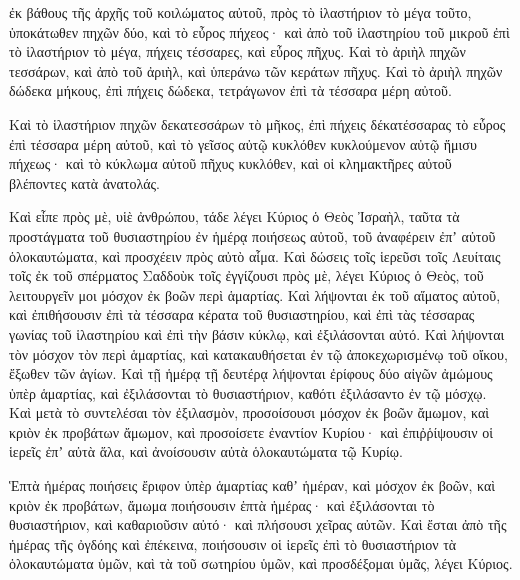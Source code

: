 {ἐκ βάθους τῆς ἀρχῆς τοῦ κοιλώματος αὐτοῦ, πρὸς τὸ ἱλαστήριον τὸ μέγα τοῦτο, ὑποκάτωθεν πηχῶν δύο, καὶ τὸ εὖρος πήχεος· καὶ ἀπὸ τοῦ ἱλαστηρίου τοῦ μικροῦ ἐπὶ τὸ ἱλαστήριον τὸ μέγα, πήχεις τέσσαρες, καὶ εὖρος πῆχυς.
Καὶ τὸ ἀριὴλ πηχῶν τεσσάρων, καὶ ἀπὸ τοῦ ἀριὴλ, καὶ ὑπεράνω τῶν κεράτων πῆχυς.
Καὶ τὸ ἀριὴλ πηχῶν δώδεκα μήκους, ἐπὶ πήχεις δώδεκα, τετράγωνον ἐπὶ τὰ τέσσαρα μέρη αὐτοῦ.
\par }{\PP {}Καὶ τὸ ἱλαστήριον πηχῶν δεκατεσσάρων τὸ μῆκος, ἐπὶ πήχεις δέκατέσσαρας τὸ εὖρος ἐπὶ τέσσαρα μέρη αὐτοῦ, καὶ τὸ γεῖσος αὐτῷ κυκλόθεν κυκλούμενον αὐτῷ ἥμισυ πήχεως· καὶ τὸ κύκλωμα αὐτοῦ πῆχυς κυκλόθεν, καὶ οἱ κλημακτῆρες αὐτοῦ βλέποντες κατὰ ἀνατολάς.
\par }{\PP {}Καὶ εἶπε πρὸς μὲ, υἱὲ ἀνθρώπου, τάδε λέγει Κύριος ὁ Θεὸς Ἰσραὴλ, ταῦτα τὰ προστάγματα τοῦ θυσιαστηρίου ἐν ἡμέρᾳ ποιήσεως αὐτοῦ, τοῦ ἀναφέρειν ἐπʼ αὐτοῦ ὁλοκαυτώματα, καὶ προσχέειν πρὸς αὐτὸ αἷμα.
Καὶ δώσεις τοῖς ἱερεῦσι τοῖς Λευίταις τοῖς ἐκ τοῦ σπέρματος Σαδδοὺκ τοῖς ἐγγίζουσι πρὸς μὲ, λέγει Κύριος ὁ Θεὸς, τοῦ λειτουργεῖν μοι μόσχον ἐκ βοῶν περὶ ἁμαρτίας.
Καὶ λήψονται ἐκ τοῦ αἵματος αὐτοῦ, καὶ ἐπιθήσουσιν ἐπὶ τὰ τέσσαρα κέρατα τοῦ θυσιαστηρίου, καὶ ἐπὶ τὰς τέσσαρας γωνίας τοῦ ἱλαστηρίου καὶ ἐπὶ τὴν βάσιν κύκλῳ, καὶ ἐξιλάσονται αὐτό.
Καὶ λήψονται τὸν μόσχον τὸν περὶ ἁμαρτίας, καὶ κατακαυθήσεται ἐν τῷ ἀποκεχωρισμένῳ τοῦ οἴκου, ἔξωθεν τῶν ἁγίων.
Καὶ τῇ ἡμέρᾳ τῇ δευτέρᾳ λήψονται ἐρίφους δύο αἰγῶν ἀμώμους ὑπὲρ ἁμαρτίας, καὶ ἐξιλάσονται τὸ θυσιαστήριον, καθότι ἐξιλάσαντο ἐν τῷ μόσχῳ.
Καὶ μετὰ τὸ συντελέσαι τὸν ἐξιλασμὸν, προσοίσουσι μόσχον ἐκ βοῶν ἄμωμον, καὶ κριὸν ἐκ προβάτων ἄμωμον,
καὶ προσοίσετε ἐναντίον Κυρίου· καὶ ἐπιῤῥίψουσιν οἱ ἱερεῖς ἐπʼ αὐτὰ ἅλα, καὶ ἀνοίσουσιν αὐτὰ ὁλοκαυτώματα τῷ Κυρίῳ.
\par }{\PP {}Ἑπτὰ ἡμέρας ποιήσεις ἔριφον ὑπὲρ ἁμαρτίας καθʼ ἡμέραν, καὶ μόσχον ἐκ βοῶν, καὶ κριὸν ἐκ προβάτων, ἄμωμα ποιήσουσιν
ἑπτὰ ἡμέρας· καὶ ἐξιλάσονται τὸ θυσιαστήριον, καὶ καθαριοῦσιν αὐτό· καὶ πλήσουσι χεῖρας αὐτῶν.
Καὶ ἔσται ἀπὸ τῆς ἡμέρας τῆς ὀγδόης καὶ ἐπέκεινα, ποιήσουσιν οἱ ἱερεῖς ἐπὶ τὸ θυσιαστήριον τὰ ὁλοκαυτώματα ὑμῶν, καὶ τὰ τοῦ σωτηρίου ὑμῶν, καὶ προσδέξομαι ὑμᾶς, λέγει Κύριος.

}
